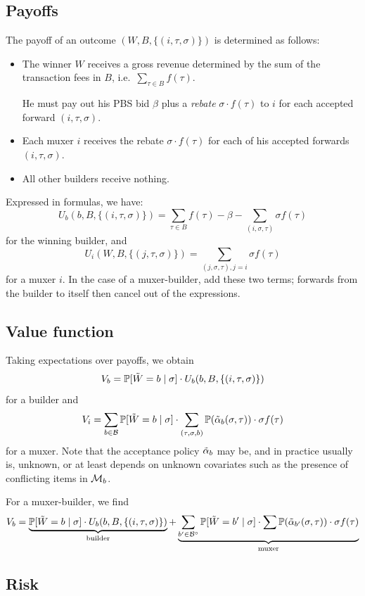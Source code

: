 \subsection*{Payoffs}

The payoff of an outcome $(W,B,\{(i,\tau,\sigma)\})$ is determined as follows:
%
\begin{itemize}
  \item 
    The winner $W$ receives a gross revenue determined by the sum of the transaction fees in $B$, i.e.~$\sum_{\tau\in B}f(\tau)$.

    He must pay out his PBS bid $\beta$ plus a \emph{rebate} $\sigma\cdot f(\tau)$ to $i$ for each accepted forward $(i,\tau,\sigma)$.
  \item
    Each muxer $i$ receives the rebate $\sigma\cdot f(\tau)$ for each of his accepted forwards $(i,\tau,\sigma)$.
  \item
    All other builders receive nothing.
\end{itemize}
%
Expressed in formulas, we have:
%
\[
  U_b(b,B,\{(i,\tau,\sigma)\}) = \sum_{\tau\in B}f(\tau) - \beta - \sum_{(i,\sigma,\tau)}\sigma f(\tau)
\]
%
for the winning builder, and
%
\[
  U_i(W,B,\{(j,\tau,\sigma)\}) = \sum_{(j,\sigma,\tau), j=i}\sigma f(\tau)
\]
%
for a muxer $i$.
%
In the case of a muxer-builder, add these two terms; forwards from the builder to itself then cancel out of the expressions.

\subsection*{Value function}
Taking expectations over payoffs, we obtain
%
\[
  V_b = \mathbb{P}[\tilde{W}=b \mid \sigma] \cdot U_b(b,B,\{(i,\tau,\sigma)\})
\]
%
for a builder and 
%
\[
  V_i = \sum_{b\in\mathcal{B}} \mathbb{P}[\tilde{W}=b\mid\sigma]\cdot \sum_{(\tau,\sigma,b)}\mathbb{P}(\tilde{\alpha}_b(\sigma,\tau))\cdot\sigma f(\tau)
\]
%
for a muxer.
%
Note that the acceptance policy $\tilde{\alpha}_b$ may be, and in practice usually is, unknown, or at least depends on unknown covariates such as the presence of conflicting items in $\mathcal{M}_b$.

For a muxer-builder, we find
\[
  V_b = \underbrace{\mathbb{P}[\tilde{W}=b \mid \sigma] \cdot U_b(b,B,\{(i,\tau,\sigma)\})}_{\text{builder}} + 
    \underbrace{\sum_{b'\in\mathcal{B}^\circ}\mathbb{P}[\tilde{W}=b' \mid \sigma] \cdot \sum\mathbb{P}(\tilde{\alpha}_{b'}(\sigma,\tau))\cdot\sigma f(\tau)}_{\text{muxer}}
\]


\subsection*{Risk}

